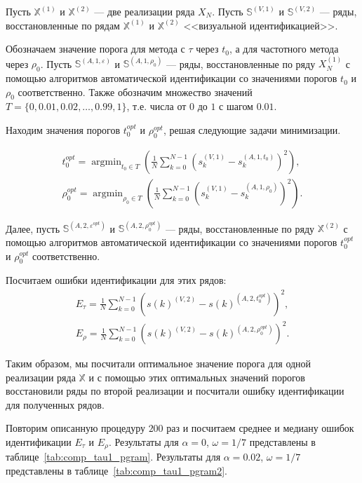 \documentclass[specialist,
               substylefile = spbu.rtx,
               subf,href,colorlinks=true, 12pt]{disser}
\def\argmin{\mathop{\mathrm{argmin}}}
\begin{document}
Пусть $\mathbb{X}^{(1)}$ и $\mathbb{X}^{(2)}$ --- две реализации ряда $X_N$.
Пусть $\mathbb{S}^{(V,1)}$ и  $\mathbb{S}^{(V,2)}$ --- ряды, восстановленные по рядам $\mathbb{X}^{(1)}$ и $\mathbb{X}^{(2)}$ <<визуальной идентификацией>>.


Обозначаем значение порога для метода с $\tau$ через $t_0$, а для частотного метода через $\rho_0$. 
Пусть $\mathbb{S}^{(A,1,\varepsilon)}$ и  $\mathbb{S}^{(A,1, \rho_0)}$ --- ряды, восстановленные по ряду $X_N^{(1)}$  с помощью алгоритмов автоматической идентификации со значениями порогов $t_0$ и $\rho_0$ соответственно.
Также обозначим множество значений $T = \{0,0.01,0.02,\ldots, 0.99,1\}$, т.е. числа от $0$ до $1$ с шагом $0.01$.

Находим значения порогов $t_0^{opt}$ и $\rho_0^{opt}$, решая следующие задачи минимизации.

\begin{gather*}
t_0^{opt} = \argmin_{t_0 \in T}{\left(\frac{1}{N}\sum_{k=0}^{N-1}{\left(s_k^{(V,1)} - s_k^{(A,1,t_0)}\right)}^2\right)}, \\
\rho_0^{opt} = \argmin_{\rho_0 \in T}{\left(\frac{1}{N}\sum_{k=0}^{N-1}{\left(s_k^{(V,1)} - s_k^{(A,1,\rho_0)}\right)}    ^2\right)}.
\end{gather*}

Далее, пусть  $\mathbb{S}^{(A,2,\varepsilon^{opt})}$ и  $\mathbb{S}^{(A,2, \rho_0^{opt})}$ --- ряды, восстановленные по ряду $\mathbb{X}^{(2)}$  с помощью алгоритмов автоматической идентификации со значениями порогов $t_0^{opt}$ и $\rho_0^{opt}$ соответственно.

Посчитаем ошибки идентификации для этих рядов:
\begin{gather*}
E_{\tau} = \frac{1}{N}\sum_{k=0}^{N-1}{\left(s(k)^{(V,2)} - s(k)^{(A,2,t_0^{opt})}\right)^2}, \\
E_{\rho} = \frac{1}{N}\sum_{k=0}^{N-1}{\left(s(k)^{(V,2)} - s(k)^{(A,2,\rho_0^{opt})}\right)^2}.
\end{gather*}

Таким образом, мы посчитали оптимальное значение порога для одной реализации ряда $\mathbb{X}$ и с помощью этих оптимальных значений порогов восстановили ряды по второй реализации и посчитали ошибку идентификации для полученных рядов.

Повторим описанную процедуру $200$ раз и посчитаем среднее и медиану ошибок идентификации $E_{\tau}$ и $E_{\rho}$. Результаты для $\alpha = 0$, $\omega = 1/7$ представлены в таблице~\ref{tab:comp_tau1_pgram}. Результаты для $\alpha = 0.02$, $\omega = 1/7$ представлены в таблице~\ref{tab:comp_tau1_pgram2}.
\end{document}
